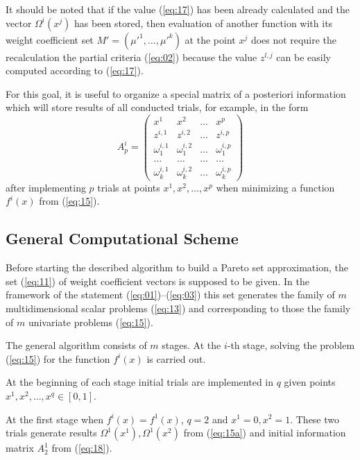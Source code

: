 \documentclass[runningheads]{llncs}
\begin{document}
It should be noted that if the value (\ref{eq:17}) has been already calculated and the vector $\Omega^i(x^j)$ has been stored, then evaluation of another function with its weight coefficient set $M'=(\mu'^1, \dots, \mu'^k)$ at the point $x^j$ does not require the recalculation the partial criteria (\ref{eq:02}) because the value $z^{l, j}$ can be easily computed according to (\ref{eq:17}).

For this goal, it is useful to organize a special matrix of a posteriori information which will store results of all conducted trials, for example, in the form
\begin{equation}
    \label{eq:18}
A^i_p =
\begin{pmatrix}
x^1 & x^2 & \dots & x^p \\
z^{i,1} & z^{i,2} & \dots & z^{i,p} \\
\omega_1^{i,1} & \omega_1^{i,2} & \dots & \omega_1^{i,p} \\
\dots & \dots & \dots & \dots \\
\omega_k^{i,1} & \omega_k^{i,2} & \dots & \omega_k^{i,p}
\end{pmatrix}
\end{equation}
after implementing $p$ trials at points $x^1, x^2, \dots, x^p$ when minimizing a function $f^i(x)$ from (\ref{eq:15}).

\subsection{General Computational Scheme}

Before starting the described algorithm to build a Pareto set approximation, the set (\ref{eq:11}) of weight coefficient vectors is supposed to be given. In the framework of the statement (\ref{eq:01})--(\ref{eq:03}) this set generates the family of $m$ multidimensional scalar problems (\ref{eq:13}) and corresponding to those the family of $m$ univariate problems (\ref{eq:15}). 

The general algorithm consists of $m$ stages. At the $i$-th stage, solving the problem (\ref{eq:15}) for the function $f^i(x)$  is carried out.

At the beginning of each stage initial trials are implemented in $q$ given points $x^1, x^2, \dots, x^q \in [0,1]$.

At the first stage when $f^i(x)=f^1(x)$, $q=2$ and $x^1=0, x^2=1$. These two trials generate results $\Omega^1(x^1), \Omega^1(x^2)$ from (\ref{eq:15a}) and initial information matrix $A^1_2$ from (\ref{eq:18}). 
\end{document}
